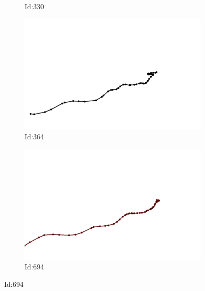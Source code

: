 \documentclass[12pt,twoside]{report}
\begin{document}
\begin{figure}
\begin{subfigure}[b]{0.20\textwidth}
\caption{Id:330}
\end{subfigure}
\begin{subfigure}[b]{0.20\textwidth}
\centering
\includegraphics[width=\textwidth]{../../trajectories/364.png}
\caption{Id:364}
\end{subfigure}
\begin{subfigure}[b]{0.20\textwidth}
\centering
\includegraphics[width=\textwidth]{../../trajectories/694.png}
\caption{Id:694}
\end{subfigure}
\end{figure}
\end{document}
